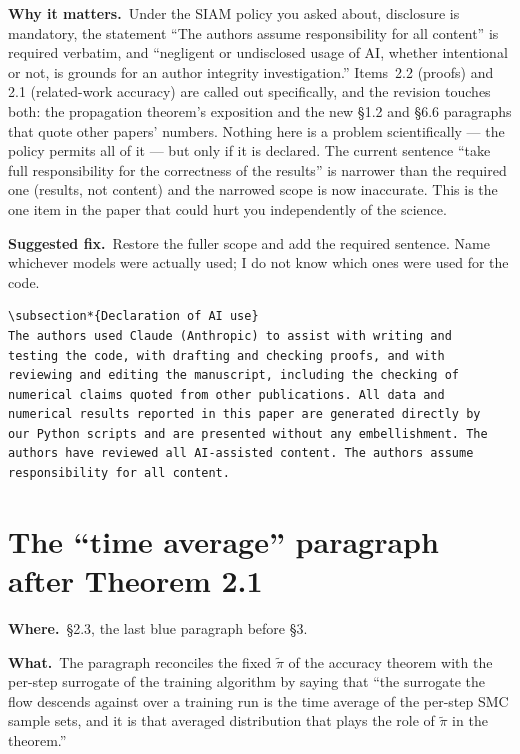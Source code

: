 \documentclass[11pt]{article}
\newcommand{\where}[1]{\smallskip\noindent\textbf{Where.}\ #1\par}
\newcommand{\what}[1]{\smallskip\noindent\textbf{What.}\ #1\par}
\newcommand{\why}[1]{\smallskip\noindent\textbf{Why it matters.}\ #1\par}
\newcommand{\fix}[1]{\smallskip\noindent\textbf{Suggested fix.}\ #1\par}
\begin{document}
\why{Under the SIAM policy you asked about, disclosure is mandatory, the
statement ``The authors assume responsibility for all content'' is required
verbatim, and ``negligent or undisclosed usage of AI, whether intentional or
not, is grounds for an author integrity investigation.'' Items~2.2 (proofs) and
2.1 (related-work accuracy) are called out specifically, and the revision
touches both: the propagation theorem's exposition and the new \S1.2 and \S6.6
paragraphs that quote other papers' numbers. Nothing here is a problem
scientifically --- the policy permits all of it --- but only if it is declared.
The current sentence ``take full responsibility for the correctness of the
results'' is narrower than the required one (results, not content) and the
narrowed scope is now inaccurate. This is the one item in the paper that could
hurt you independently of the science.}

\fix{Restore the fuller scope and add the required sentence. Name whichever
models were actually used; I do not know which ones were used for the code.}

\begin{verbatim}
\subsection*{Declaration of AI use}
The authors used Claude (Anthropic) to assist with writing and
testing the code, with drafting and checking proofs, and with
reviewing and editing the manuscript, including the checking of
numerical claims quoted from other publications. All data and
numerical results reported in this paper are generated directly by
our Python scripts and are presented without any embellishment. The
authors have reviewed all AI-assisted content. The authors assume
responsibility for all content.
\end{verbatim}

\section{The ``time average'' paragraph after Theorem 2.1}
\label{sec:timeavg}

\where{\S2.3, the last blue paragraph before \S3.}

\what{The paragraph reconciles the fixed $\tilde\pi$ of the accuracy theorem
with the per-step surrogate of the training algorithm by saying that ``the
surrogate the flow descends against over a training run is the time average of
the per-step SMC sample sets, and it is that averaged distribution that plays
the role of $\tilde\pi$ in the theorem.''}
\end{document}
